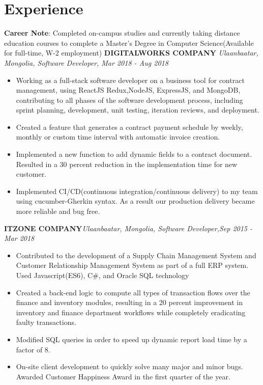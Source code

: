 \documentclass[letterpaper,11pt]{article}
\newcommand{\resumeItemListStart}{\begin{itemize}}
\newcommand{\resumeItemListEnd}{\end{itemize}\vspace{-5pt}}
\begin{document}
\section{Experience}
  \textbf{Career Note}{: Completed on-campus studies and currently taking distance education courses to complete a Master's Degree in Computer Science(Available for full-time, W-2 employment)}
  \vfill
      \textbf{DIGITALWORKS COMPANY} \hfill \textit{Ulaanbaatar, Mongolia, Software Developer, Mar 2018 - Aug 2018}
        \resumeItemListStart
          \item{
            Working as a full-stack software developer on a business tool for contract management, using ReactJS
            Redux,NodeJS, ExpressJS, and MongoDB, contributing to all phases of the software development
            process, including sprint planning, development, unit testing, iteration reviews, and deployment.
          }
          \item{
            Created a feature that generates a contract payment schedule by weekly, monthly or custom time
            interval with automatic invoice creation.
          }
          \item{
           Implemented a new function to add dynamic fields to a contract document. Resulted in a 30 percent reduction in the implementation time for new customer.
          }
          \item{
            Implemented CI/CD(continuous integration/continuous delivery) to my team using cucumber-Gherkin syntax. As a result our production delivery became more reliable and bug free.
          }
        \resumeItemListEnd
  
      \textbf{ITZONE COMPANY}\hfill \textit{Ulaanbaatar, Mongolia, Software Developer,Sep 2015 - Mar 2018}
      \resumeItemListStart
        \item{
          Contributed to the development of a Supply Chain Management System and
          Customer Relationship Management System as part of a full ERP system. Used Javascript(ES6), C\#,
          and Oracle SQL technology
        }
        \item{
          Created a back-end logic to compute all types of transaction flows over the finance and inventory modules,
          resulting in a 20 percent improvement in inventory and finance department workflows while completely eradicating faulty transactions.
        }
        \item{
          Modified SQL queries in order to speed up dynamic report load time by a factor of 8.
        }
        \item{
           On-site client development to quickly solve many major and minor bugs. Awarded Customer Happiness Award in the first quarter of the year.
        }
      \resumeItemListEnd
  
\end{document}

